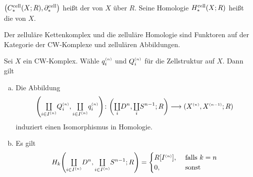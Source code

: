 \begin{definition}[{name=[{Zellulärer Kettenkomplex und zelluläre Homologie}]}]
	$\enbrace*{C_*^{\cell}(X;R),\partial_*^{\cell}}$ heißt der  von $X$ über $R$. 
	Seine Homologie $H_*^{\cell}(X;R)$ heißt die  von $X$.
\end{definition}

Der zelluläre Kettenkomplex und die zelluläre Homologie sind Funktoren auf der Kategorie der CW-Komplexe und zellulären Abbildungen.

\begin{lemma}[{name=[{über $\enbrace{\coprod Q_i^\ssbrace{n}, \coprod q_i^\ssbrace{n}}_* $ und $H_k \enbrace{\coprod_i D^n, \coprod_i S^{n-1};R}$}]},label=lem:124]
	Sei $X$ ein CW-Komplex. Wähle $q_i^\ssbrace{n}$ und $Q_i^\ssbrace{n}$ für die Zellstruktur auf $X$. Dann gilt
	\begin{enumerate}[a)]
		\item Die Abbildung
		\[
			\enbrace*{{\textstyle\coprod\limits_{i \in I^{(n)}}} Q_i^\ssbrace{n}, {\textstyle\coprod\limits_{i \in I^{(n)}}} q_i^\ssbrace{n}} 
			\colon \enbrace*{{\textstyle\coprod\limits_i} D^n, {\textstyle\coprod\limits_i} S^{n-1};R}  \longrightarrow
			\enbrace*{X^\ssbrace{n}, X^\ssbrace{n-1};R} 
		\]
		induziert einen Isomorphismus in Homologie.
		\item Es gilt
		\[
			H_k \enbrace*{{\textstyle\coprod\limits_{i\in I^\ssbrace{n}}} D^n, {\textstyle\coprod\limits_{i\in I^\ssbrace{n}}} S^{n-1};R} = \begin{cases}
				R[I^\ssbrace{n}], &\text{ falls }k=n\\
				0, & \text{ sonst}
			\end{cases}
		\] 
	\end{enumerate}
\end{lemma}
